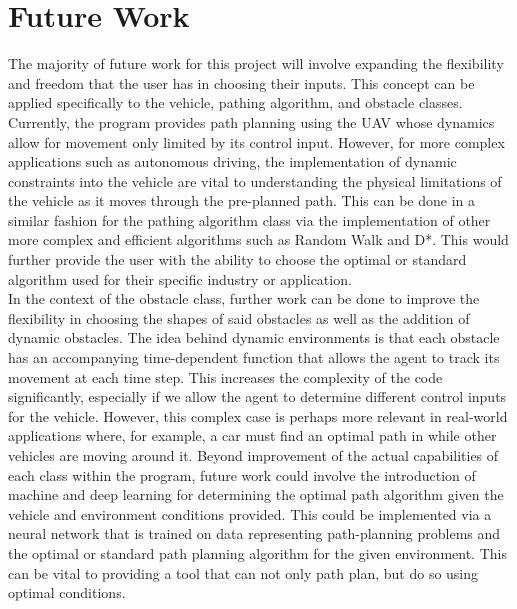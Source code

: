 \documentclass[10pt,letterpaper]{article}
\begin{document}
\section{Future Work}
The majority of future work for this project will involve expanding the flexibility and freedom that the user has in choosing their inputs. This concept can be applied specifically to the vehicle, pathing algorithm, and obstacle classes. Currently, the program provides path planning using the UAV whose dynamics allow for movement only limited by its control input. However, for more complex applications such as autonomous driving, the implementation of dynamic constraints into the vehicle are vital to understanding the physical limitations of the vehicle as it moves through the pre-planned path. This can be done in a similar fashion for the pathing algorithm class via the implementation of other more complex and efficient algorithms such as Random Walk and D*. This would further provide the user with the ability to choose the optimal or standard algorithm used for their specific industry or application. \\

\noindent In the context of the obstacle class, further work can be done to improve the flexibility in choosing the shapes of said obstacles as well as the addition of dynamic obstacles. The idea behind dynamic environments is that each obstacle has an accompanying time-dependent function that allows the agent to track its movement at each time step. This increases the complexity of the code significantly, especially if we allow the agent to determine different control inputs for the vehicle. However, this complex case is perhaps more relevant in real-world applications where, for example, a car must find an optimal path in while other vehicles are moving around it. Beyond improvement of the actual capabilities of each class within the program, future work could involve the introduction of machine and deep learning for determining the optimal path algorithm given the vehicle and environment conditions provided. This could be implemented via a neural network that is trained on data representing path-planning problems and the optimal or standard path planning algorithm for the given environment. This can be vital to providing a tool that can not only path plan, but do so using optimal conditions. 



\printbibliography 
\nocite{*}
\end{document}
